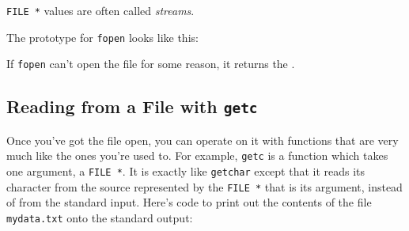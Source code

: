 {\tt FILE *} values are often called {\em streams}\/.

The prototype for {\tt fopen} looks like this:

\begin{flushleft}
\verb% FILE * fopen(char *filename, char *type); % \\*
\end{flushleft}

If {\tt fopen} can't open the file for some reason, it returns the \np.

\subsection{Reading from a File with {\tt getc}}

Once you've got the file open, you can operate on it with functions that
are very much like the ones you're used to.  For example, {\tt getc} is
a function which takes one argument, a {\tt FILE *}.  It is exactly like
{\tt getchar} except that it reads its character from the source
represented by the {\tt FILE *} that is its argument, instead of from
the standard input.  Here's code to print out the contents of the file
{\tt mydata.txt} onto the standard output:


